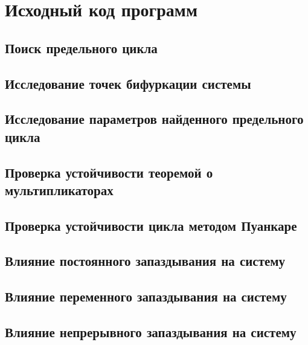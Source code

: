 \chapter{Исходный код программ}
\label{appendix:src}

\section{Поиск предельного цикла}

\clearpage

\section{Исследование точек бифуркации системы}

\clearpage

\section{Исследование параметров найденного предельного цикла}

\clearpage

\section{Проверка устойчивости теоремой о мультипликаторах}

\clearpage

\section{Проверка устойчивости цикла методом Пуанкаре}

\clearpage

\section{Влияние постоянного запаздывания на систему}

\clearpage

\section{Влияние переменного запаздывания на систему}

\clearpage

\section{Влияние непрерывного запаздывания на систему}

\clearpage

